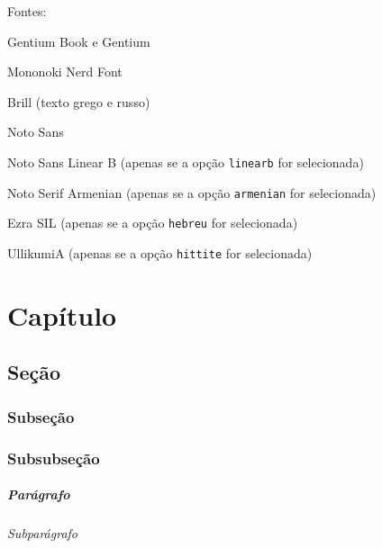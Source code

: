 \documentclass[hittite,linearb,armenian,hebraico,russian,sanskrit]{tesecaiera}
\begin{document}
\begin{compactitem}
  \item Fontes:
    \begin{compactitem}
      \item Gentium Book e Gentium
      \item Mononoki Nerd Font
      \item Brill (texto grego e russo)
      \item Noto Sans
      \item Noto Sans Linear B (apenas se a opção \texttt{linearb} for selecionada)
      \item Noto Serif Armenian (apenas se a opção \texttt{armenian} for selecionada)
      \item Ezra SIL (apenas se a opção \texttt{hebreu} for selecionada)
      \item UllikumiA (apenas se a opção \texttt{hittite} for selecionada)
    \end{compactitem}
    
\end{compactitem}

\chapter{Capítulo}\label{chap:sample_chap}

\lipsum[3]

\section{Seção}\label{sec:sample_sec}

\lipsum[2]

\subsection{Subseção}\label{sec:sample_subsec}
\lipsum[3]

\subsection{Subsubseção}\label{sec:sample_subsubsec}
\lipsum[4]

\paragraph{Parágrafo}\label{par:sample_paragraph}
\lipsum[5]

\subparagraph{Subparágrafo}\label{par:sample_subparagraph}
\lipsum[6]
\end{document}
